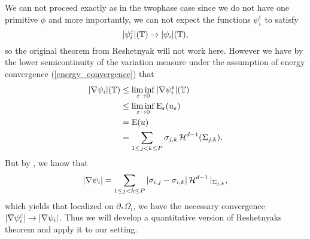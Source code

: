 \begin{remark}
	We can not proceed exactly as in the twophase case since we do not have one primitive $ \phi $ and more importantly, we can not expect the functions $ \psi_{ i }^{ \varepsilon } $ to satisfy 
	\begin{equation}
		\label{energy_convergence_of_psi_i}
		\abs{ \psi_{ i }^{ \varepsilon } } ( \operatorname{\mathbb{T}} ) \to \abs{ \psi_{ i } } ( \operatorname{\mathbb{T}} ),
	\end{equation}
	so the original theorem from Reshetnyak will not work here. However we have by the lower semicontinuity of the variation measure under the assumption of energy convergence (\ref{energy_convergence}) that
	\begin{align*}
		\abs{ \nabla \psi_{ i } } ( \operatorname{\mathbb{T}} )
		&
		\leq
		\liminf_{ \varepsilon \to 0 }
			\abs{ \nabla \psi_{ i }^{ \varepsilon } } ( \operatorname{\mathbb{T}} )
		\\
		& \leq
		\liminf_{ \varepsilon \to 0 }
			\operatorname{E}_{ \varepsilon } ( u_{ \varepsilon } )
		\\
		& =
		\operatorname{E} ( u )
		\\
		& =
		\sum_{ 1 \leq j < k \leq P }
			\sigma_{ j , k }
			\operatorname{\mathcal{H}}^{ d -1 } ( \Sigma_{ j , k } ).
	\end{align*}
	But by , we know that
	\begin{equation*}
		\abs{ \nabla \psi_{ i } }
		=
		\sum_{ 1 \leq j < k \leq P }
			\abs{ \sigma_{ i , j } - \sigma_{ i , k } }
			\operatorname{\mathcal{H}}^{ d - 1 } |_{ \Sigma_{ j , k } },
	\end{equation*}
	which yields that localized on $ \partial_{ \ast } \Omega_{ i } $, we have 
	the necessary convergence $ \abs{ \nabla \psi_{i }^{ \varepsilon } } \to 
	\abs{ \nabla \psi_{ i } } $. Thus we will develop a quantitative version of 
	Reshetnyaks theorem and apply it to our setting.
\end{remark}

